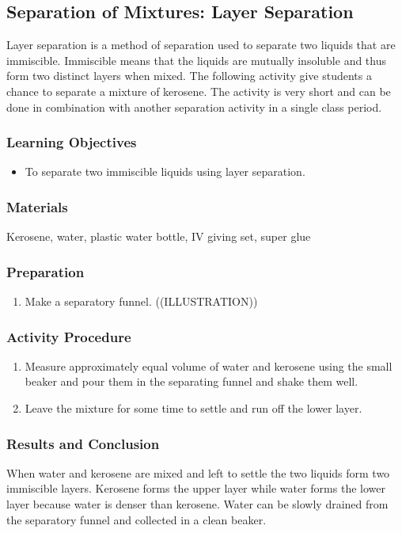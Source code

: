 \subsection{Separation of Mixtures: Layer Separation}
Layer separation is a method of separation used to separate two liquids that are immiscible. Immiscible means that the liquids are mutually insoluble and thus form two distinct layers when mixed. The following activity give students a chance to separate a mixture of kerosene. The activity is very short and can be done in combination with another separation activity in a single class period.

\subsubsection*{Learning Objectives}
\begin{itemize}
\item{To separate two immiscible liquids using layer separation.}
\end{itemize}

\subsubsection*{Materials}
Kerosene, water, plastic water bottle, IV giving set, super glue

\subsubsection*{Preparation}
\begin{enumerate}
\item{Make a separatory funnel. ((ILLUSTRATION))}
\end{enumerate}

\subsubsection*{Activity Procedure}
\begin{enumerate}
\item{Measure approximately equal volume of water and kerosene using the small beaker and pour them in the separating funnel and shake them well.}
\item{Leave the mixture for some time to settle and run off the lower layer.}
\end{enumerate}

\subsubsection*{Results and Conclusion}
When water and kerosene are mixed and left to settle the two liquids form two immiscible layers. Kerosene forms the upper layer while water forms the lower layer because water is denser than kerosene. Water can be slowly drained from the separatory funnel and collected in a clean beaker.

